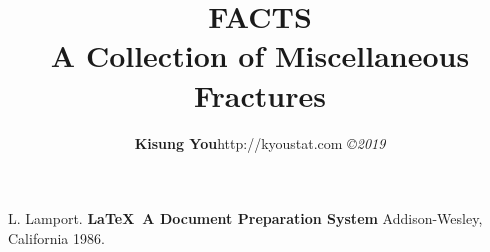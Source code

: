 \documentclass[12pt,reqno]{book}      %
\title{{\Huge FACTS} \\ \vspace{0.2cm} {\Large A Collection of Miscellaneous Fractures}}
\author{\htmladdnormallink           %
{\textbf{Kisung You}}{http://kyoustat.com}
{\small\em \copyright 2019}}
\date{ }
\begin{document}
\maketitle
{}
\tableofcontents
%
%
%
%
%


\pagestyle{headings}




\begin{thebibliography}{99}
 L. Lamport. {\bf \LaTeX \ A Document Preparation System}
Addison-Wesley, California 1986.
\end{thebibliography}


\end{document}
